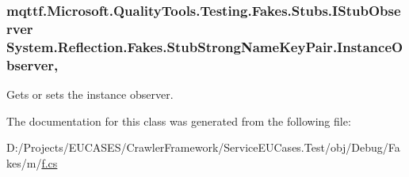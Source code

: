 \hypertarget{class_system_1_1_reflection_1_1_fakes_1_1_stub_strong_name_key_pair_aabab3ad50fa794d8d556623acb99514f}{
\subsubsection[{Instance\-Observer}]{\setlength{\rightskip}{0pt plus 5cm}mqttf.\-Microsoft.\-Quality\-Tools.\-Testing.\-Fakes.\-Stubs.\-I\-Stub\-Observer System.\-Reflection.\-Fakes.\-Stub\-Strong\-Name\-Key\-Pair.\-Instance\-Observer\hspace{0.3cm}{\ttfamily [get]}, {\ttfamily [set]}}}\label{class_system_1_1_reflection_1_1_fakes_1_1_stub_strong_name_key_pair_aabab3ad50fa794d8d556623acb99514f}


Gets or sets the instance observer.



The documentation for this class was generated from the following file\-:\begin{DoxyCompactItemize}
\item 
D\-:/\-Projects/\-E\-U\-C\-A\-S\-E\-S/\-Crawler\-Framework/\-Service\-E\-U\-Cases.\-Test/obj/\-Debug/\-Fakes/m/\hyperlink{m_2f_8cs}{f.\-cs}\end{DoxyCompactItemize}

